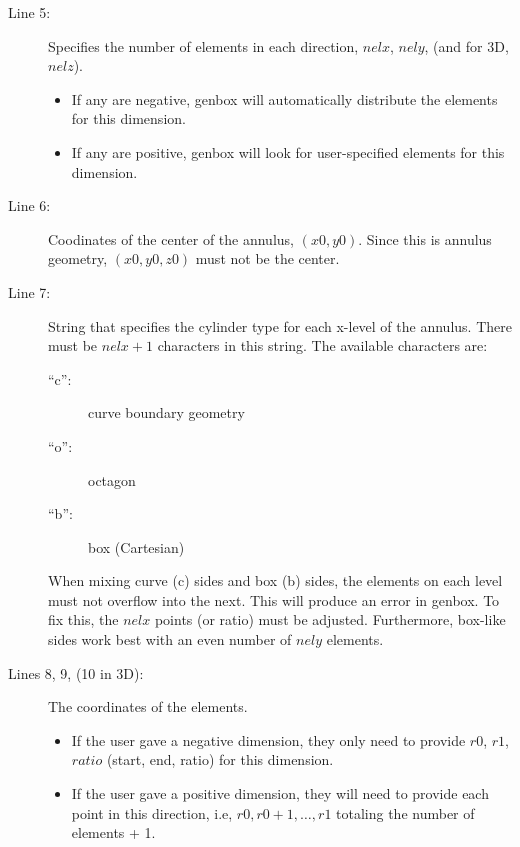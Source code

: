\begin{description}

  \item[Line 5:] Specifies the number of elements in each direction, \(nelx\),
    \(nely\), (and for 3D, \(nelz\)).

    \begin{itemize}

      \item If any are negative, genbox will automatically distribute the
        elements for this dimension.

      \item If any are positive, genbox will look for user-specified elements
        for this dimension.

    \end{itemize}

  \item[Line 6:] Coodinates of the center of the annulus, \((x0, y0)\). Since this
    is annulus geometry, \((x0,y0,z0)\) must not be the center.

  \item[Line 7:] String that specifies the cylinder type for each x-level of the
    annulus.  There must be \(nelx+1\) characters in this string.  The available
    characters are:

    \begin{description}
      \item[``c'':] curve boundary geometry
      \item[``o'':] octagon
      \item[``b'':] box (Cartesian)
    \end{description}

    When mixing curve (c) sides and box (b) sides, the elements on each level
    must not overflow into the next.  This will produce an error in genbox.  To
    fix this, the \(nelx\) points (or ratio) must be adjusted.  Furthermore,
    box-like sides work best with an even number of \(nely\) elements.

  \item[Lines 8, 9, (10 in 3D):] The coordinates of the elements.

    \begin{itemize}

      \item If the user gave a negative dimension, they only need to provide
        \(r0\), \(r1\), \(ratio\) (start, end, ratio) for this dimension.

      \item If the user gave a positive dimension, they will need to provide
        each point in this direction, i.e, \(r0, r0+1, \ldots, r1\) totaling the
        number of elements + 1.

    \end{itemize}

\end{description}

